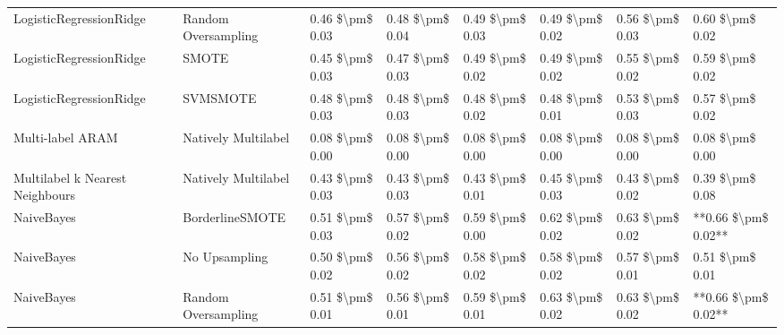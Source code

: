 \begin{tabular}{llllllll}
        LogisticRegressionRidge &           Random Oversampling & 0.46 \$\textbackslash pm\$ 0.03 &           0.48 \$\textbackslash pm\$ 0.04 &       0.49 \$\textbackslash pm\$ 0.03 &        0.49 \$\textbackslash pm\$ 0.02 &                         0.56 \$\textbackslash pm\$ 0.03 &     0.60 \$\textbackslash pm\$ 0.02 \\
        LogisticRegressionRidge &                         SMOTE & 0.45 \$\textbackslash pm\$ 0.03 &           0.47 \$\textbackslash pm\$ 0.03 &       0.49 \$\textbackslash pm\$ 0.02 &        0.49 \$\textbackslash pm\$ 0.02 &                         0.55 \$\textbackslash pm\$ 0.02 &     0.59 \$\textbackslash pm\$ 0.02 \\
        LogisticRegressionRidge &                      SVMSMOTE & 0.48 \$\textbackslash pm\$ 0.03 &           0.48 \$\textbackslash pm\$ 0.03 &       0.48 \$\textbackslash pm\$ 0.02 &        0.48 \$\textbackslash pm\$ 0.01 &                         0.53 \$\textbackslash pm\$ 0.03 &     0.57 \$\textbackslash pm\$ 0.02 \\
               Multi-label ARAM &           Natively Multilabel & 0.08 \$\textbackslash pm\$ 0.00 &           0.08 \$\textbackslash pm\$ 0.00 &       0.08 \$\textbackslash pm\$ 0.00 &        0.08 \$\textbackslash pm\$ 0.00 &                         0.08 \$\textbackslash pm\$ 0.00 &     0.08 \$\textbackslash pm\$ 0.00 \\
Multilabel k Nearest Neighbours &           Natively Multilabel & 0.43 \$\textbackslash pm\$ 0.03 &           0.43 \$\textbackslash pm\$ 0.03 &       0.43 \$\textbackslash pm\$ 0.01 &        0.45 \$\textbackslash pm\$ 0.03 &                         0.43 \$\textbackslash pm\$ 0.02 &     0.39 \$\textbackslash pm\$ 0.08 \\
                     NaiveBayes &               BorderlineSMOTE & 0.51 \$\textbackslash pm\$ 0.03 &           0.57 \$\textbackslash pm\$ 0.02 &       0.59 \$\textbackslash pm\$ 0.00 &        0.62 \$\textbackslash pm\$ 0.02 &                         0.63 \$\textbackslash pm\$ 0.02 & **0.66 \$\textbackslash pm\$ 0.02** \\
                     NaiveBayes &                 No Upsampling & 0.50 \$\textbackslash pm\$ 0.02 &           0.56 \$\textbackslash pm\$ 0.02 &       0.58 \$\textbackslash pm\$ 0.02 &        0.58 \$\textbackslash pm\$ 0.02 &                         0.57 \$\textbackslash pm\$ 0.01 &     0.51 \$\textbackslash pm\$ 0.01 \\
                     NaiveBayes &           Random Oversampling & 0.51 \$\textbackslash pm\$ 0.01 &           0.56 \$\textbackslash pm\$ 0.01 &       0.59 \$\textbackslash pm\$ 0.01 &        0.63 \$\textbackslash pm\$ 0.02 &                         0.63 \$\textbackslash pm\$ 0.02 & **0.66 \$\textbackslash pm\$ 0.02** \\

\end{tabular}
